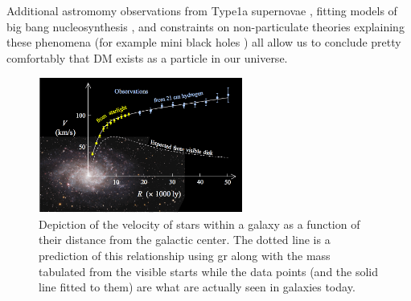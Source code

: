 Additional astromomy observations from Type1a supernovae \cite{type1a-supernova-2010}, fitting
models of big bang nucleosynthesis \cite{nucleosynthesis-1998}, and constraints on non-particulate
theories explaining these phenomena (for example mini black holes
\cite{constraints-primordial-black-holes-2021})
all allow us to conclude pretty comfortably that DM exists as a particle in our universe.

\begin{figure}
  \centering
  \includegraphics[width=0.6\textwidth]{figures/theory/rotation-curve-evidence-for-dm.png}
  \caption{
    Depiction of the velocity of stars within a galaxy as a function of their distance
    from the galactic center. The dotted line is a prediction of this relationship using
    \ac{gr} along with the mass tabulated from the visible starts while the data points
    (and the solid line fitted to them) are what are actually seen in galaxies today.
  }
  \label{fig:rotation-curve}
\end{figure}


